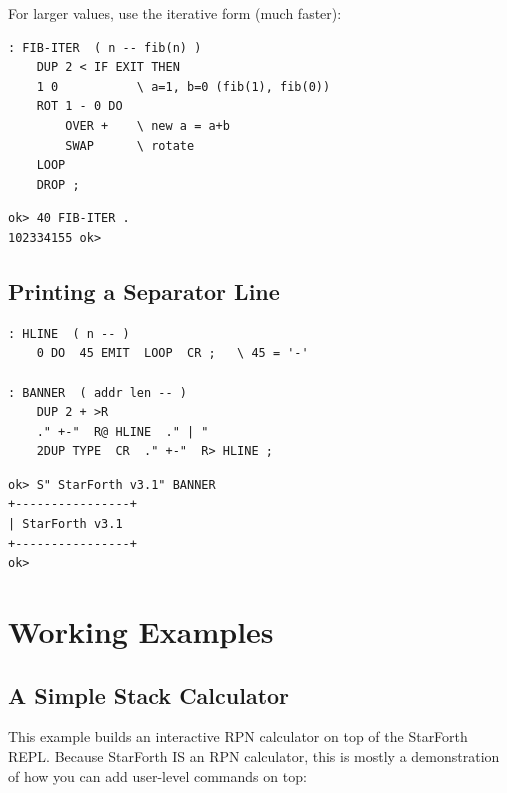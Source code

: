 For larger values, use the iterative form (much faster):

\begin{lstlisting}[language=Forth]
: FIB-ITER  ( n -- fib(n) )
    DUP 2 < IF EXIT THEN
    1 0           \ a=1, b=0 (fib(1), fib(0))
    ROT 1 - 0 DO
        OVER +    \ new a = a+b
        SWAP      \ rotate
    LOOP
    DROP ;
\end{lstlisting}

\begin{lstlisting}[language=Forth]
ok> 40 FIB-ITER .
102334155 ok>
\end{lstlisting}

\section{Printing a Separator Line}
\label{sec:idiom-separator}

\begin{lstlisting}[language=Forth]
: HLINE  ( n -- )
    0 DO  45 EMIT  LOOP  CR ;   \ 45 = '-'

: BANNER  ( addr len -- )
    DUP 2 + >R
    ." +-"  R@ HLINE  ." | "
    2DUP TYPE  CR  ." +-"  R> HLINE ;
\end{lstlisting}

\begin{lstlisting}[language=Forth]
ok> S" StarForth v3.1" BANNER
+----------------+
| StarForth v3.1
+----------------+
ok>
\end{lstlisting}

\chapter{Working Examples}
\label{chap:examples}

\section{A Simple Stack Calculator}
\label{sec:example-calculator}

This example builds an interactive RPN calculator on top of the StarForth
REPL. Because StarForth IS an RPN calculator, this is mostly a demonstration
of how you can add user-level commands on top:

